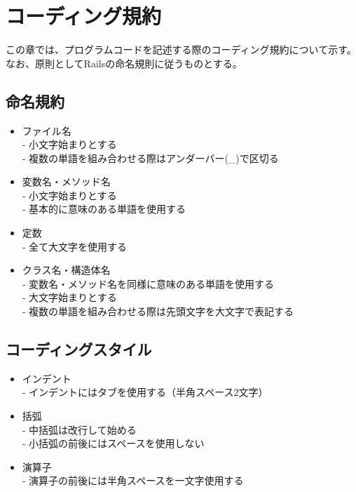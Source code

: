 \documentclass[a4j]{jarticle}
\begin{document}
\section{コーディング規約}
この章では、プログラムコードを記述する際のコーディング規約について示す。なお、原則としてRailsの命名規則に従うものとする。
\subsection{命名規約}

\begin{itemize}
  \item ファイル名\\
  - 小文字始まりとする\\
  - 複数の単語を組み合わせる際はアンダーバー(\_)で区切る\\

\item 変数名・メソッド名\\
‐ 小文字始まりとする\\
‐ 基本的に意味のある単語を使用する\\

\end{itemize}
\begin{itemize}
\item 定数\\
‐ 全て大文字を使用する\\
\end{itemize}
\begin{itemize}
\item クラス名・構造体名\\
‐ 変数名・メソッド名を同様に意味のある単語を使用する\\
‐ 大文字始まりとする\\
‐ 複数の単語を組み合わせる際は先頭文字を大文字で表記する\\
\end{itemize}
\subsection{コーディングスタイル}
\begin{itemize}
\item インデント\\
‐ インデントにはタブを使用する（半角スペース2文字）
\end{itemize}
\begin{itemize}
\item 括弧\\
‐ 中括弧は改行して始める\\
‐ 小括弧の前後にはスペースを使用しない
\end{itemize}
\begin{itemize}
\item 演算子\\
‐ 演算子の前後には半角スペースを一文字使用する
\end{itemize}
\end{document}
